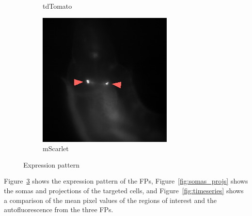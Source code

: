 \begin{figure}
\begin{subfigure}[b]{0.3\textwidth}
		\caption{tdTomato}
		\label{fig:tdtomato}
	\end{subfigure}
	\quad%
	\begin{subfigure}[b]{0.3\textwidth}
		\includegraphics[width=\textwidth]{mScarlet_full}
		\caption{mScarlet}
		\label{fig:mscarlet}
	\end{subfigure}
	\caption{Expression pattern}
	\label{fig:expression_pattern}
\end{figure}

Figure~\ref{fig:expression_pattern} shows the expression pattern of the FPs,
Figure~\ref{fig:somas_projs} shows the somas and projections of the targeted cells,
and Figure~\ref{fig:timeseries} shows a comparison of the mean pixel values of the regions of interest
and the autofluorescence from the three FPs.

